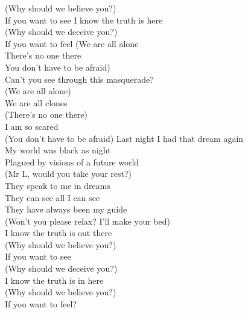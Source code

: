  (Why should we believe you?)\\
 If you want to see
\hop
{} I know the truth is here\\
 (Why should we deceive you?)\\
 If you want to feel
\hops
(We are all alone\\
There's no one there\\
You don't have to be afraid)\\
\hop
Can't you see through this masquerade?\\
(We are all alone)\\
We are all clones\\
(There's no one there)\\
I am so scared\\
(You don't have to be afraid)
\hops
Last night I had that dream again\\
My world was black as night\\
Plagued by visions of a future world\\
(Mr L, would you take your rest?)\\
\hop
They speak to me in dreams\\
They can see all I can see\\
They have always been my guide\\
(Won't you please relax? I'll make your bed)\\
\hops
{} I know the truth is out there\\
 (Why should we believe you?)\\
 If you want to see\\
 (Why should we deceive you?)\\
 I know the truth is in here\\
 (Why should we believe you?)\\
 If you want to feel?

\clearpage
{}

